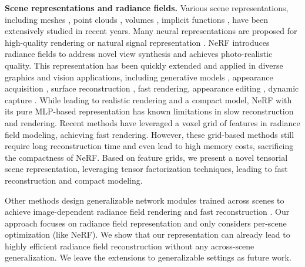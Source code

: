 \documentclass[runningheads]{llncs}
\newcommand{\boldstartspace}[1]{\vspace{0.1in}\noindent\textbf{#1}}
\begin{document}
\boldstartspace{Scene representations and radiance fields.}
Various scene representations, including meshes \cite{groueix2018papier,wang2018pixel2mesh}, point clouds \cite{qi2017pointnet}, volumes \cite{ji2017surfacenet,qi2016volumetric}, implicit functions \cite{mescheder2018occupancy,peng2020convolutional}, have been extensively studied in recent years.
Many neural representations  are proposed for high-quality rendering or natural signal representation \cite{sitzmann2019siren,tancik2020fourfeat,liang2022coordx}.
NeRF \cite{mildenhall2020nerf} introduces radiance fields to address novel view synthesis and achieves photo-realistic quality.
This representation has been quickly extended and applied in diverse graphics and vision applications, including generative models \cite{chan2021pi,niemeyer2021giraffe}, appearance acquisition \cite{bi2020neural,boss2021nerd}, surface reconstruction \cite{wang2021neus,oechsle2021unisurf}, fast rendering, appearance editing \cite{xiang2021neutex,liu2021editing}, dynamic capture \cite{li2021neural,park2021hypernerf}  \cite{Niemeyer2021CVPR,Chan2022EG3D}.  
While leading to realistic rendering and a compact model, NeRF with its pure MLP-based representation has known limitations in slow reconstruction and rendering. Recent methods \cite{yu2021plenoctrees,liu2020neural,hedman2021baking} have leveraged a voxel grid of features in radiance field modeling, achieving fast rendering. However, these grid-based methods still require long reconstruction time and even lead to high memory costs, sacrificing the compactness of NeRF. 
Based on feature grids, we present a novel tensorial scene representation, leveraging tensor factorization techniques, leading to fast reconstruction and compact modeling. 


Other methods design generalizable network modules trained across scenes to achieve image-dependent radiance field rendering  and fast reconstruction \cite{chen2021mvsnerf,xu2022point}. Our approach focuses on radiance field representation and only considers per-scene optimization (like NeRF). We show that our representation can already lead to highly efficient radiance field reconstruction without any across-scene generalization. We leave the extensions to generalizable settings as future work.
\end{document}
